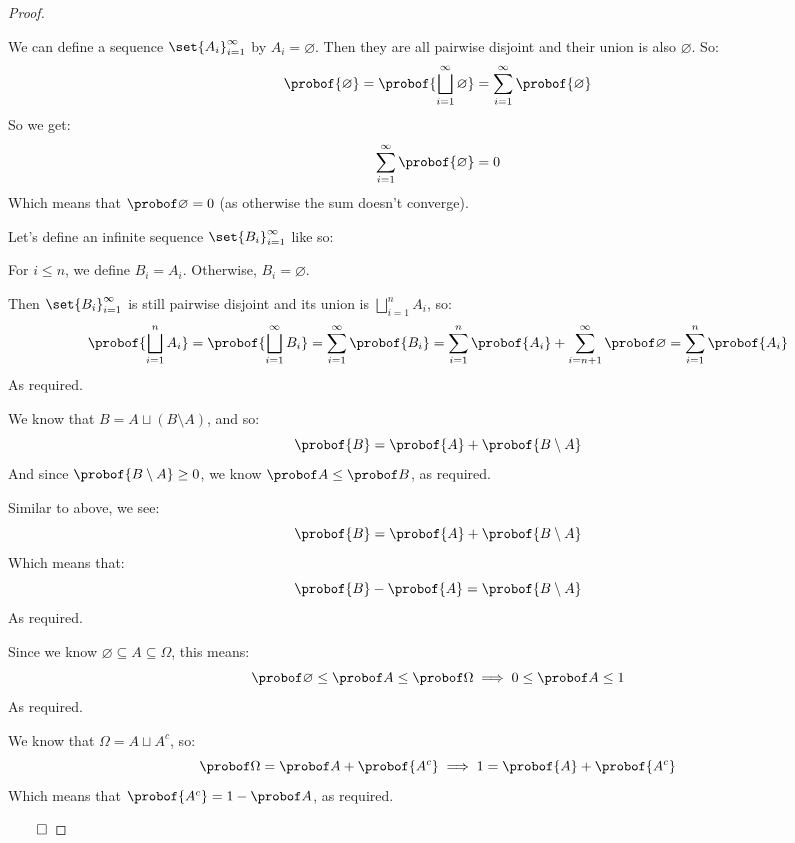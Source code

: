 \begin{proof}

	\begin{msecenumerate}[0pt]
		\mitem We can define a sequence $\set{A_i}_{i=1}^\infty$ by $A_i=\varnothing$.
		Then they are all pairwise disjoint and their union is also $\varnothing$.
		So:
			\[ \probof{\varnothing} = \probof{\bigsqcup_{i=1}^\infty \varnothing} = \sum_{i=1}^\infty\probof{\varnothing} \]
		So we get:
			\[ \sum_{i=1}^\infty\probof{\varnothing} = 0 \]
		Which means that $\probof\varnothing=0$ (as otherwise the sum doesn't converge).

		\mitem Let's define an infinite sequence $\set{B_i}_{i=1}^\infty$ like so:

		For $i\leq n$, we define $B_i=A_i$. Otherwise, $B_i=\varnothing$.
		
		Then $\set{B_i}_{i=1}^\infty$ is still pairwise disjoint and its union is $\bigsqcup\limits_{i=1}^n A_i$, so:
			\[ \probof{\bigsqcup_{i=1}^n A_i} = \probof{\bigsqcup_{i=1}^\infty B_i} = \sum_{i=1}^\infty\probof{B_i}
			= \sum_{i=1}^n\probof{A_i} + \sum_{i=n+1}^\infty\probof\varnothing = \sum_{i=1}^n\probof{A_i} \]
		As required.

		\mitem We know that $B=A\sqcup(B\setminus A)$, and so:
			\[ \probof{B} = \probof{A} + \probof{B\setminus A} \]
		And since $\probof{B\setminus A}\geq0$, we know $\probof A\leq\probof B$, as required.

		\mitem Similar to above, we see:
			\[ \probof{B} = \probof{A} + \probof{B\setminus A} \]
		Which means that:
			\[ \probof{B} - \probof{A} = \probof{B\setminus A} \]
		As required.

		\mitem Since we know $\varnothing\subseteq A\subseteq\Omega$, this means:
			\[ \probof\varnothing\leq\probof A\leq\probof\Omega \implies 0\leq\probof A\leq 1 \]
		As required.

		\mitem We know that $\Omega=A\sqcup A^c$, so:
			\[ \probof\Omega = \probof A+\probof{A^c} \implies 1=\probof{A}+\probof{A^c} \]
		Which means that $\probof{A^c}=1-\probof A$, as required.
	\end{msecenumerate}

\hfill$\qed$

\end{proof}


